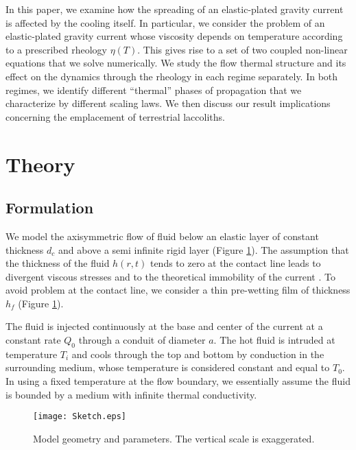 In  this paper,  we examine  how  the spreading  of an  elastic-plated
gravity current is affected by  the cooling itself.  In particular, we
consider  the  problem  of  an elastic-plated  gravity  current  whose
viscosity depends  on temperature  according to a  prescribed rheology
$\eta(T)$.   This  gives rise  to  a  set  of two  coupled  non-linear
equations  that  we solve  numerically.   We  study the  flow  thermal
structure and its effect on the  dynamics through the rheology in each
regime separately.  In both regimes, we identify different ``thermal''
phases  of  propagation  that  we characterize  by  different  scaling
laws.  We   then  discuss  our  result   implications  concerning  the
emplacement of terrestrial laccoliths.


\section{Theory}
\label{C3-sec:theory}

\subsection{Formulation}
\label{sec:formulation}

We model  the axisymmetric  flow of  fluid below  an elastic  layer of
constant  thickness  $d_c$  and  above a  semi  infinite  rigid  layer
\citep{Michaut:2011kg} (Figure \ref{Figure2-1}).   The assumption that
the thickness of the fluid $h(r,t)$  tends to zero at the contact line
leads to divergent viscous stresses  and to the theoretical immobility
of the current \citep{Flitton:1999iv}. To avoid problem at the contact
line,  we  consider  a  thin   pre-wetting  film  of  thickness  $h_f$
\citep{Lister:2013ia} (Figure \ref{Figure2-1}).

The  fluid is  injected continuously  at the  base and  center of  the
current  at  a constant  rate  $Q_0$  through  a conduit  of  diameter
$a$. The hot fluid is intruded  at temperature $T_i$ and cools through
the  top and  bottom by  conduction in  the surrounding  medium, whose
temperature is  considered constant  and equal to  $T_0$.  In  using a
fixed  temperature at  the flow  boundary, we  essentially assume  the
fluid is bounded by a medium with infinite thermal conductivity.

\begin{figure}
  \begin{center}
    \graphicspath{ {/Users/thorey/Documents/These/Projet/Refroidissement/Skin_Model/Figure/JFM_V13/} }
    \texttt{[image: Sketch.eps]}
    \caption{Model geometry and parameters. The vertical scale is exaggerated.}
    \label{Figure2-1}
  \end{center}
\end{figure}

